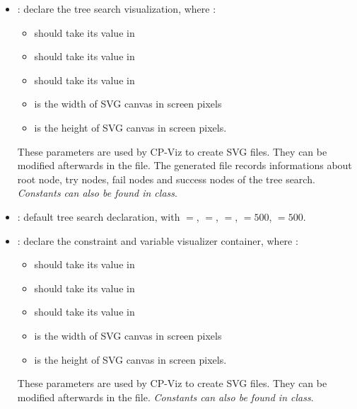 \begin{itemize}

\item {}: declare the tree search visualization, where :
	\begin{itemize}
	\item {} should take its value in 
	\item {} should take its value in 
	\item {} should take its value in 
	\item {} is the width of SVG canvas in screen pixels
	\item {} is the height of SVG canvas in screen pixels. 
	\end{itemize}
These parameters are used by CP-Viz to create SVG files. They can be modified afterwards in the  file. The generated file records informations about root node, try nodes, fail nodes and success nodes of the tree search. 
\textit{Constants can also be found in  class}.

\item {}: default tree search declaration, with $=$, $=$, $=$, $=500$, $=500$.

\item {}: declare the constraint and variable visualizer container, where :
	\begin{itemize}
	\item {} should take its value in 
	\item {} should take its value in 
	\item {} should take its value in 
	\item {} is the width of SVG canvas in screen pixels
	\item {} is the height of SVG canvas in screen pixels. 
	\end{itemize}
These parameters are used by CP-Viz to create SVG files. They can be modified afterwards in the  file.
\textit{Constants can also be found in  class}.


\end{itemize}
